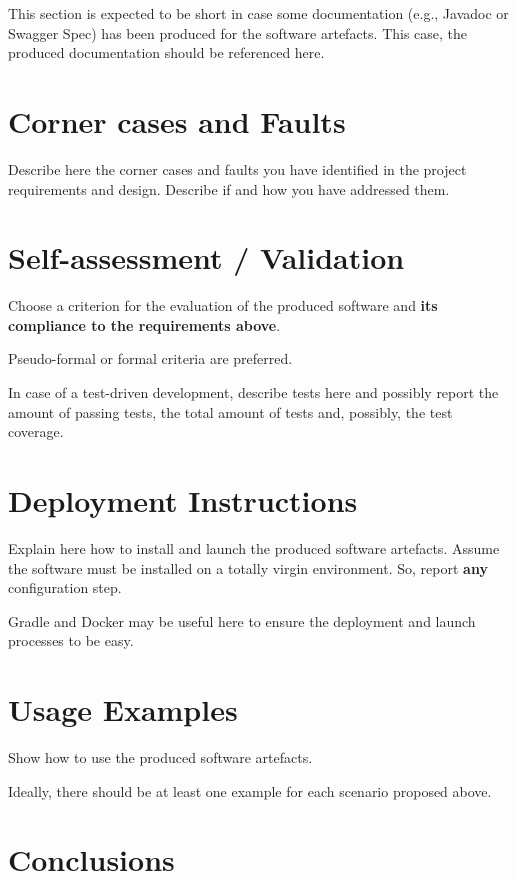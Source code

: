 \documentclass{scrartcl}
\begin{document}
This section is expected to be short in case some documentation (e.g., Javadoc or Swagger Spec) has been produced for the software artefacts.
%
This case, the produced documentation should be referenced here.

\section{Corner cases and Faults}\label{sec:corner-cases-and-faults}

Describe here the corner cases and faults you have identified in the project requirements and design.
%
Describe if and how you have addressed them.

\section{Self-assessment / Validation}\label{sec:self-assessment-/-validation}

Choose a criterion for the evaluation of the produced software and \textbf{its compliance to the requirements above}.

Pseudo-formal or formal criteria are preferred.

In case of a test-driven development, describe tests here and possibly report the amount of passing tests, the total amount of tests and, possibly, the test coverage.

\section{Deployment Instructions}\label{sec:deployment-instructions}

Explain here how to install and launch the produced software artefacts.
%
Assume the software must be installed on a totally virgin environment.
%
So, report \textbf{any} configuration step.

Gradle and Docker may be useful here to ensure the deployment and launch processes to be easy.

\section{Usage Examples}\label{sec:usage-examples}

Show how to use the produced software artefacts.

Ideally, there should be at least one example for each scenario proposed above.

\section{Conclusions}\label{sec:conclusions}
\end{document}
